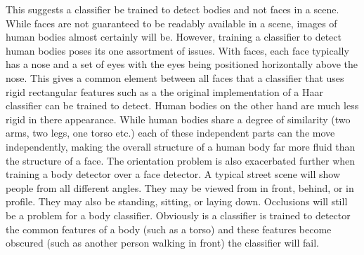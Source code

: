 \documentclass[conference]{IEEEtran}
\begin{document}
This suggests a classifier be trained to detect bodies and not faces in a scene. While faces are not guaranteed to be readably available in a scene, images of human bodies almost certainly will be. However, training a classifier to detect human bodies poses its one assortment of issues. With faces, each face typically has a nose and a set of eyes with the eyes being positioned horizontally above the nose. This gives a common element between all faces that a classifier that uses rigid rectangular features such as a the original implementation of a Haar classifier can be trained to detect. Human bodies on the other hand are much less rigid in there appearance. While human bodies share a degree of similarity (two arms, two legs, one torso etc.) each of these independent parts can the move independently, making the overall structure of a human body far more fluid than the structure of a face. The orientation problem is also exacerbated further when training a body detector over a face detector. A typical street scene will show people from all different angles. They may be viewed from in front, behind, or in profile. They may also be standing, sitting, or laying down. Occlusions will still be a problem for a body classifier. Obviously is a classifier is trained to detector the common features of a body (such as a torso) and these features become obscured (such as another person walking in front) the classifier will fail.
\end{document}
